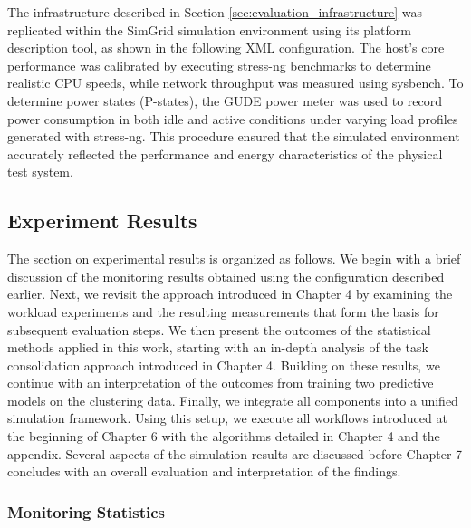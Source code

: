 The infrastructure described in Section \ref{sec:evaluation_infrastructure} was replicated within the SimGrid simulation environment using its platform description tool, as shown in the following XML configuration. The host’s core performance was calibrated by executing stress-ng benchmarks to determine realistic CPU speeds, while network throughput was measured using sysbench. To determine power states (P-states), the GUDE power meter was used to record power consumption in both idle and active conditions under varying load profiles generated with stress-ng. This procedure ensured that the simulated environment accurately reflected the performance and energy characteristics of the physical test system.



\subsection{Experiment Results}
\label{sec:experiment_results}
The section on experimental results is organized as follows. We begin with a brief discussion of the monitoring results obtained using the configuration described earlier. Next, we revisit the approach introduced in Chapter 4 by examining the workload experiments and the resulting measurements that form the basis for subsequent evaluation steps. We then present the outcomes of the statistical methods applied in this work, starting with an in-depth analysis of the task consolidation approach introduced in Chapter 4. Building on these results, we continue with an interpretation of the outcomes from training two predictive models on the clustering data. Finally, we integrate all components into a unified simulation framework. Using this setup, we execute all workflows introduced at the beginning of Chapter 6 with the algorithms detailed in Chapter 4 and the appendix. Several aspects of the simulation results are discussed before Chapter 7 concludes with an overall evaluation and interpretation of the findings.
\subsubsection{Monitoring Statistics}
\label{sec:monitoring_statistics}

